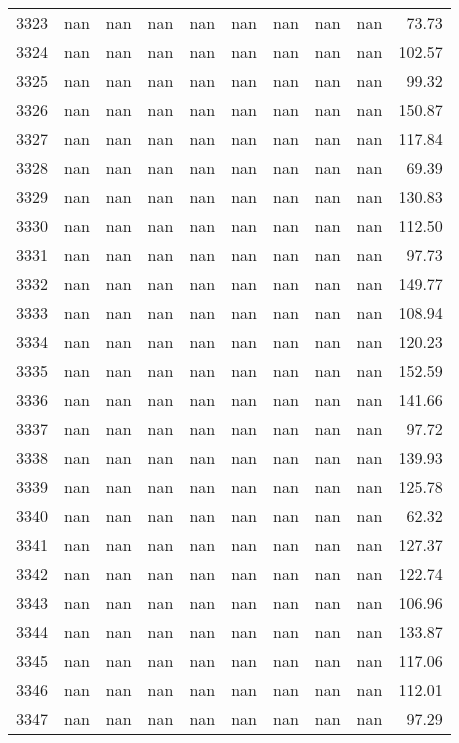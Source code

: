 \begin{tabular}{lrrrrrrrrr}
3323 & nan & nan & nan & nan & nan & nan & nan & nan & 73.73 \\
3324 & nan & nan & nan & nan & nan & nan & nan & nan & 102.57 \\
3325 & nan & nan & nan & nan & nan & nan & nan & nan & 99.32 \\
3326 & nan & nan & nan & nan & nan & nan & nan & nan & 150.87 \\
3327 & nan & nan & nan & nan & nan & nan & nan & nan & 117.84 \\
3328 & nan & nan & nan & nan & nan & nan & nan & nan & 69.39 \\
3329 & nan & nan & nan & nan & nan & nan & nan & nan & 130.83 \\
3330 & nan & nan & nan & nan & nan & nan & nan & nan & 112.50 \\
3331 & nan & nan & nan & nan & nan & nan & nan & nan & 97.73 \\
3332 & nan & nan & nan & nan & nan & nan & nan & nan & 149.77 \\
3333 & nan & nan & nan & nan & nan & nan & nan & nan & 108.94 \\
3334 & nan & nan & nan & nan & nan & nan & nan & nan & 120.23 \\
3335 & nan & nan & nan & nan & nan & nan & nan & nan & 152.59 \\
3336 & nan & nan & nan & nan & nan & nan & nan & nan & 141.66 \\
3337 & nan & nan & nan & nan & nan & nan & nan & nan & 97.72 \\
3338 & nan & nan & nan & nan & nan & nan & nan & nan & 139.93 \\
3339 & nan & nan & nan & nan & nan & nan & nan & nan & 125.78 \\
3340 & nan & nan & nan & nan & nan & nan & nan & nan & 62.32 \\
3341 & nan & nan & nan & nan & nan & nan & nan & nan & 127.37 \\
3342 & nan & nan & nan & nan & nan & nan & nan & nan & 122.74 \\
3343 & nan & nan & nan & nan & nan & nan & nan & nan & 106.96 \\
3344 & nan & nan & nan & nan & nan & nan & nan & nan & 133.87 \\
3345 & nan & nan & nan & nan & nan & nan & nan & nan & 117.06 \\
3346 & nan & nan & nan & nan & nan & nan & nan & nan & 112.01 \\
3347 & nan & nan & nan & nan & nan & nan & nan & nan & 97.29 \\

\end{tabular}

